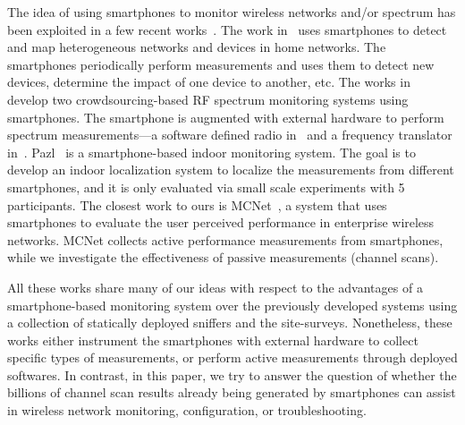 The idea of using smartphones to monitor wireless networks and/or spectrum has
been exploited in a few recent
works~\cite{nychis:hotwireless2014,nika:hotwireless2014,zhang:hotmobile2015,shi2014crowdsourcing}.
The work in~\cite{nychis:hotwireless2014} uses smartphones to detect and map
heterogeneous networks and devices in home networks. The smartphones
periodically perform measurements and uses them to detect new devices, determine
the impact of one device to another, etc. The works
in~\cite{nika:hotwireless2014,zhang:hotmobile2015} develop two
crowdsourcing-based RF spectrum monitoring systems using smartphones. The
smartphone is augmented with external hardware to perform spectrum
measurements---a software defined radio in~\cite{nika:hotwireless2014} and a
frequency translator in~\cite{zhang:hotmobile2015}. Pazl~\cite{radu2013pazl} is
a smartphone-based indoor \wifi{} monitoring system. The goal is to develop an
indoor localization system to localize the measurements from different
smartphones, and it is only evaluated via small scale experiments with 5
participants. The closest work to ours is MCNet~\cite{rosen2014mcnet}, a system
that uses smartphones to evaluate the user perceived performance in enterprise
wireless networks. MCNet collects active performance measurements from
smartphones, while we investigate the effectiveness of passive measurements
(channel scans).

All these works share many of our ideas with respect to the advantages of a
smartphone-based monitoring system over the previously developed systems using a
collection of statically deployed sniffers and the site-surveys. Nonetheless,
these works either instrument the smartphones with external
hardware to collect specific types of measurements, or perform active
measurements through deployed softwares. In contrast, in this paper, we try to
answer the question of whether the billions of \wifi{} channel scan results
already being generated by smartphones can assist in wireless network monitoring,
configuration, or troubleshooting.
